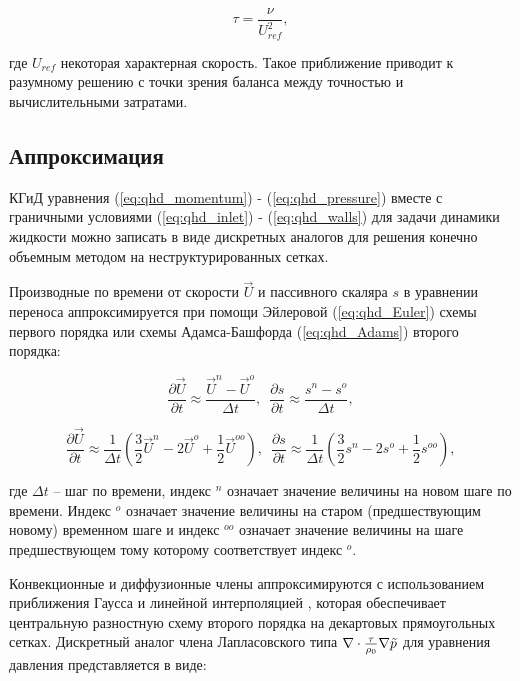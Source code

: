 \begin{equation}\label{eq:qhd_tau_hydro_scale}
      \tau = \frac{\nu}{U_{ref}^2},
\end{equation}

\noindent где $U_{ref}$ некоторая характерная скорость. Такое приближение приводит к разумному решению с точки зрения баланса между точностью и вычислительными затратами.

\subsection{Аппроксимация}

КГиД уравнения (\ref{eq:qhd_momentum}) - (\ref{eq:qhd_pressure}) вместе с граничными условиями (\ref{eq:qhd_inlet}) - (\ref{eq:qhd_walls}) для задачи динамики жидкости можно записать в виде дискретных аналогов для решения конечно объемным методом на неструктурированных сетках.

Производные по времени от скорости $\vec U$ и пассивного скаляра $s$ в уравнении переноса аппроксимируется при помощи Эйлеровой (\ref{eq:qhd_Euler}) схемы первого порядка или схемы Адамса-Башфорда (\ref{eq:qhd_Adams}) второго порядка:

\begin{equation}\label{eq:qhd_Euler}
    \frac{\partial \vec{U}}{\partial t} \approx \frac{ \vec{U}^n-\vec{U}^o}{\Delta t}, \,\,\, 
    \frac{\partial s}{\partial t} \approx \frac{ s^n-s^o}{\Delta t},
\end{equation}

\begin{equation}\label{eq:qhd_Adams}
    \frac{\partial \vec{U}}{\partial t} \approx \frac{1}{\Delta t} \left  (\frac{3}{2}\vec{U}^n - 2\vec{U}^o + \frac{1}{2} \vec{U}^{oo} \right), \,\,\,
    \frac{\partial s}{\partial t} \approx \frac{1}{\Delta t} \left (\frac{3}{2}{s}^n - 2{s}^o + \frac{1}{2} {s}^{oo}\right),
\end{equation}

где $\Delta t$ -- шаг по времени, индекс $^n$ означает значение величины на новом шаге по времени. Индекс $^o$ означает значение величины на старом (предшествующим новому) временном шаге и индекс $^{oo}$ означает значение величины на шаге предшествующем тому которому соответствует индекс $^o$. 

Конвекционные и диффузионные члены аппроксимируются с использованием приближения Гаусса и линейной интерполяцией \cite{PericCFDLecture,FerzigerPeric}, которая обеспечивает центральную разностную схему второго порядка на декартовых прямоугольных сетках. Дискретный аналог члена Лапласовского типа $\nabla \cdot \frac{\tau}{\rho_0}\nabla \Tilde{p}$ для уравнения давления представляется в виде:


